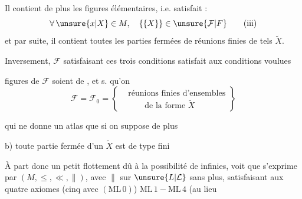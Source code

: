 
Il contient de plus les  figures élémentaires, i.e. satisfait :
\begingroup\makeatletter\tagsleft@true\makeatother
\[
 \forall\,\unsure{x|X}\in M,\quad \{\{X\}\}\in\unsure{\mathcal F|F}
 \tag*{(iii)}
\]
\endgroup
et par suite, il contient toutes les parties fermées de réunions finies de tels $\widetilde X$.

Inversement,  $\mathcal F$ satisfaisant ces trois conditions satisfait aux conditions voulues

  figures de $\mathcal F$ soient de ,  et s. qu'on 
\begingroup\makeatletter\tagsleft@true\makeatother
\[
 \mathcal F=\mathcal F_{0}=
 \left\{\begin{aligned}
 &\text{réunions finies d'ensembles}\\
 &\qquad\text{de la forme }\widetilde X
 \end{aligned}\right\}
 \tag*{a)}
\]
\endgroup

 qui ne donne un atlas que si on suppose de plus

b) toute partie fermée d'un $\widetilde X$  est de type fini

À part donc un petit flottement dû à la possibilité de    infinies,  voit que  s'exprime par $(M,{\leq},{\ll},{\parallel})$, avec $\parallel$  sur $\unsure{L|\mathcal L}$ sans plus,  satisfaisant aux quatre axiomes (cinq avec $(\mathrm{ML\,0})$) $\mathrm{ML\,1}-\mathrm{ML\,4}$ (au lieu
